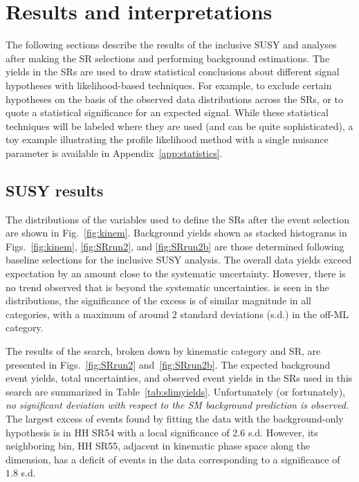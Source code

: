 \chapter{Results and interpretations}
\label{chap:results}

The following sections describe the results of the inclusive SUSY and \smft
analyses after making the SR selections and performing 
background estimations. The yields in the SRs are used to draw statistical
conclusions about different signal hypotheses with likelihood-based
techniques. For example, to exclude certain
hypotheses on the basis of the observed data distributions across the SRs,
or to quote a statistical significance for an expected signal.
While these statistical techniques will be labeled where they are used
(and can be quite sophisticated),
a toy example illustrating the profile likelihood method with a single nuisance
parameter is available in Appendix~\ref{app:statistics}.

\section{SUSY results}
\label{sec:ssresults}

The distributions of the variables used to define the SRs after the event selection are
shown in Fig.~\ref{fig:kinem}.
Background yields shown as stacked histograms in Figs.~\ref{fig:kinem}, \ref{fig:SRrun2}, and \ref{fig:SRrun2b} are
those determined following baseline selections for the inclusive SUSY analysis.
The overall data yields exceed expectation by an amount close to the systematic uncertainty.
However, there is no trend observed that is beyond the systematic uncertainties.
is seen in the distributions,
the significance of the excess is of similar magnitude in all categories, with a maximum of around 2 standard deviations (s.d.) in the off-\PZ ML category. 

The results of the search, broken down by kinematic category and SR,
are presented in Figs.~\ref{fig:SRrun2} and~\ref{fig:SRrun2b}.
The expected background event yields, total uncertainties, and observed event yields in the SRs used in this search
are summarized in Table~\ref{tab:slimyields}.
Unfortunately (or fortunately), {\it no significant deviation with respect to the SM background prediction is observed.}
The largest excess of events found by fitting the data with the background-only
hypothesis is in HH SR54 with a local significance of 2.6 s.d.
However, its neighboring bin, HH SR55, adjacent in kinematic phase space along the \HT dimension, has a
deficit of events in the data corresponding to a
significance of $1.8$ s.d.

